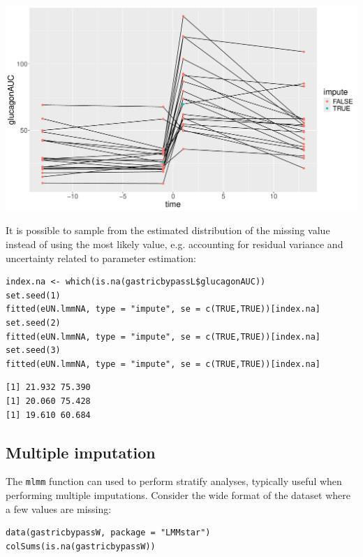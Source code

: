 \documentclass[12pt]{article}
\begin{document}
\begin{center}
\includegraphics[trim={0 0 0 0},width=1\textwidth]{./figures/imputation.pdf}
\end{center}

It is possible to sample from the estimated distribution of the
missing value instead of using the most likely value, e.g. accounting
for residual variance and uncertainty related to parameter estimation:
\lstset{language=r,label= ,caption= ,captionpos=b,numbers=none}
\begin{lstlisting}
index.na <- which(is.na(gastricbypassL$glucagonAUC))
set.seed(1)
fitted(eUN.lmmNA, type = "impute", se = c(TRUE,TRUE))[index.na]
set.seed(2)
fitted(eUN.lmmNA, type = "impute", se = c(TRUE,TRUE))[index.na]
set.seed(3)
fitted(eUN.lmmNA, type = "impute", se = c(TRUE,TRUE))[index.na]
\end{lstlisting}

\begin{verbatim}
[1] 21.932 75.390
[1] 20.060 75.428
[1] 19.610 60.684
\end{verbatim}


\clearpage

\subsection{Multiple imputation}
\label{sec:org8ea84d4}

The \texttt{mlmm} function can used to perform stratify analyses, typically
useful when performing multiple imputations. Consider the wide format
of the dataset where a few values are missing:
\lstset{language=r,label= ,caption= ,captionpos=b,numbers=none}
\begin{lstlisting}
data(gastricbypassW, package = "LMMstar")
colSums(is.na(gastricbypassW))
\end{lstlisting}
\end{document}
